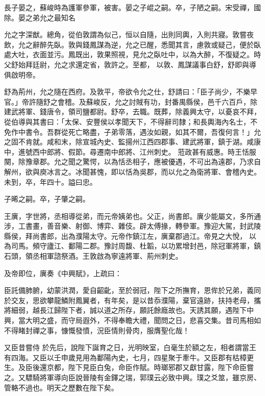 \begin{pinyinscope}
 長子晏之，蘇峻時為護軍參軍，被害。晏之子崐之嗣。卒，子陋之嗣。宋受禪，國除。晏之弟允之最知名



 允之字深猷。總角，從伯敦謂為似己，恒以自隨，出則同輿，入則共寢。敦嘗夜飲，允之辭醉先臥。敦與錢鳳謀為逆，允之已醒，悉聞其言，慮敦或疑己，便於臥處大吐，衣面並污。鳳既出，敦果照視，見允之臥吐中，以為大醉，不復疑之。時父舒始拜廷尉，允之求還定省，敦許之。至都，
 以敦、鳳謀議事白舒，舒即與導俱啟明帝。



 舒為荊州，允之隨在西府。及敦平，帝欲令允之仕，舒請曰：「臣子尚少，不樂早官。」帝許隨舒之會稽。及蘇峻反，允之討賊有功，封番禺縣侯，邑千六百戶，除建武將軍、錢唐令，領司鹽都尉。舒卒，去職。既葬，除義興太守，以憂哀不拜，從伯導與其書曰：「太保、安豐侯以孝聞天下，不得辭司隸；和長輿海內名士，不免作中書令。吾群從死亡略盡，子弟零落，遇汝如親，如其不爾，吾復何言！」允之固不肯就。咸和末，除宣城內史、監揚州江西四郡事、建武將軍，鎮于湖。咸康中，進號西中郎將、假節。尋遷南中郎將、江州刺史。
 蒞政甚有威惠。時王恬服闋，除豫章郡。允之聞之驚愕，以為恬丞相子，應被優遇，不可出為遠郡，乃求自解州，欲與庾冰言之。冰聞甚愧，即以恬為吳郡，而以允之為衛將軍、會稽內史。未到，卒，年四十。謚曰忠。



 子晞之嗣。卒，子肇之嗣。



 王廙，字世將，丞相導從弟，而元帝姨弟也。父正，尚書郎。廙少能屬文，多所通涉，工書畫，善音樂、射御、博弈、雜伎。辟太傅掾，轉參軍。豫迎大駕，封武陵縣侯，拜尚書郎，出為濮陽太守。元帝作鎮江左，廙棄郡過江。帝見之大悅，
 以為司馬。頻守廬江、鄱陽二郡。豫討周馥、杜韜，以功累增封邑，除冠軍將軍，鎮石頭，領丞相軍諮祭酒。王敦啟為寧遠將軍、荊州刺史。



 及帝即位，廙奏《中興賦》，上疏曰：



 臣託備肺腑，幼蒙洪潤，愛自齠齔，至於弱冠，陛下之所撫育，恩侔於兄弟，義同於交友，思欲攀龍鱗附鳳翼者，有年矣，是以昔忝濮陽，棄官遠跡，扶持老母，攜將細弱，越長江歸陛下者，誠以道之所存，願託餘廕故也。天誘其願，遇陛下中興，當大明之盛，而守局遐外，不得奉瞻大禮，聞問之日，悲喜交集。昔司馬相如不得睹封禪之事，慷慨發憤，況臣情則骨肉，服膺聖化哉！



 又臣昔嘗侍
 於先后，說陛下誕育之日，光明映室，白毫生於額之左，相者謂當王有四海。又臣以壬申歲見用為鄱陽內史，七月，四星聚于牽牛。又臣郡有枯樟更生。及臣後還京都，陛下見臣白兔，命臣作賦。時瑯邪郡又獻甘露，陛下命臣嘗之。又驃騎將軍導向臣說晉陵有金鐸之瑞，郭璞云必致中興。璞之爻筮，雖京房、管輅不過也。明天之歷數在陛下矣。




\end{pinyinscope}
